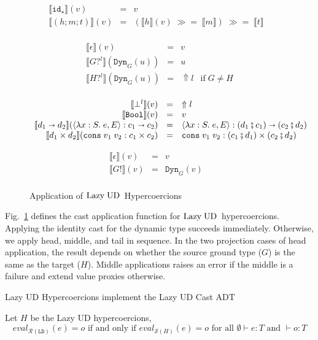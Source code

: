 \documentclass[runningheads]{llncs}
\newcommand{\sidecond}[1]{\text{if}\;#1}
\newcommand{\figequalto}[3]{#1 & = & #2 & #3 \\}
\newcommand{\LUD}{\ensuremath{\text{Lazy\;UD}}}
\newcommand{\RMachine}[1]{\ensuremath{\mathcal{R}(#1)}}
\newcommand{\LDMachine}{\RMachine{\BLD}}
\newcommand{\SMachine}[1]{\ensuremath{\mathcal{S}(#1)}}
\newcommand{\error}[1]{\ensuremath{\Uparrow#1}}
\newcommand{\Tdyn}[0]{\ensuremath{\star}}
\newcommand{\Pbool}[0]{\ensuremath{\mathtt{Bool}}}
\newcommand{\Pfunc}[2]{\ensuremath{#1 \shortrightarrow #2}}
\newcommand{\Pprod}[2]{\ensuremath{#1 \times #2}}
\newcommand{\elam}[3]{\lambda#1:#2.\;#3}
\newcommand{\econs}[2]{\mathtt{cons} \; #1 \; #2}
\newcommand{\ecast}[2]{\ensuremath{#1 : #2}}
\newcommand{\vdyn}[2]{\mathtt{Dyn}_{#1}(#2)}
\newcommand{\vfunc}[4]{\langle\elam{#1}{#2}{#3},#4\rangle}
\newcommand{\vcons}[2]{\econs{#1}{#2}}
\newcommand{\BLD}[0]{\ensuremath{\mathtt{LD}}}
\newcommand{\cnfid}[1]{\ensuremath{\mathtt{id}_{#1}}}
\newcommand{\hcci}[0]{\cnfid{\Tdyn}}
\newcommand{\hccc}[3]{\ensuremath{(#1;#2;#3)}}
\newcommand{\hche}[0]{\ensuremath{\epsilon}}
\newcommand{\hchp}[2]{\ensuremath{#1?^{#2}}}
\newcommand{\hcmbool}[0]{\Pbool}
\newcommand{\hcmfunc}[2]{\Pfunc{#1}{#2}}
\newcommand{\hcmprod}[2]{\Pprod{#1}{#2}}
\newcommand{\hcmfail}[1]{\ensuremath{\bot^l}}
\newcommand{\hcte}[0]{\ensuremath{\epsilon}}
\newcommand{\hcti}[1]{\ensuremath{#1!}}
\newcommand{\mbind}[0]{\ensuremath{\;\gg=\;}}
\newcommand{\denote}[1]{\ensuremath{\llbracket #1 \rrbracket}}
\newcommand{\compose}[2]{\ensuremath{#1 \fatsemi #2}}
\newcommand{\expressiontyping}[3]{\ensuremath{#1 \vdash #2 : #3}}
\newcommand{\valuetyping}[2]{\ensuremath{\vdash #1 : #2}}
\newcommand{\withmachineevalto}[3]{\ensuremath{\mathit{eval}_{#1}(#2)=#3}}
\newcommand{\machineequiv}[2]{
	\ensuremath{
		\withmachineevalto{#1}{e}{o}	
		\text{ if and only if }
		\withmachineevalto{#2}{e}{o}
		\text{ for all }
		\expressiontyping{\emptyset}{e}{T}
		\text{ and }
		\valuetyping{o}{T}
	}}
\begin{document}
\begin{figure}
	\fbox{$\denote{c}_c(v)=r$}
	\[
	\begin{array}{rclr}
	\figequalto{\denote{\hcci}(v)}{v}{}
	\figequalto{\denote{\hccc{h}{m}{t}}(v)}{
		(\denote{h}(v) \mbind \denote{m})
		\mbind \denote{t}
	}{}
	\end{array}
	\]
	
	\fbox{$\denote{h}_h(v)=r$}
	\[
	\begin{array}{rclr}
	\figequalto{\denote{\hche}(v)}{v}{}
	\figequalto{\denote{\hchp{G}{l}}(\vdyn{G}{u})}{u}{}
	\figequalto{\denote{\hchp{H}{l}}(\vdyn{G}{u})}{\error{l}}{
		\sidecond{G \neq H}
	}
	\end{array}
	\]
	
	\fbox{$\denote{m}_m(v)=r$}
	\[
	\begin{array}{rclr}
	\figequalto{\denote{\hcmfail{l}}(v)}{\error{l}}{}
	\figequalto{\denote{\hcmbool}(v)}{v}{}
	\figequalto{\denote{\hcmfunc{d_1}{d_2}}(\ecast{\vfunc{x}{S}{e}{E}}{\Pfunc{c_1}{c_2}})}{
		\ecast{\vfunc{x}{S}{e}{E}}{\Pfunc{(\compose{d_1}{c_1})}{(\compose{c_2}{d_2})}}
	}{}
	\figequalto{\denote{\hcmprod{d_1}{d_2}}(\ecast{\vcons{v_1}{v_2}}{\Pprod{c_1}{c_2}})}{
		\ecast{\vcons{v_1}{v_2}}{\Pprod{(\compose{c_1}{d_1})}{(\compose{c_2}{d_2})}}
	}{}
	\end{array}
	\]
	
	\fbox{$\denote{t}_t(v)=r$}
	\[
	\begin{array}{rclr}
	\figequalto{\denote{\hcte}(v)}{v}{}
	\figequalto{\denote{\hcti{G}}(v)}{\vdyn{G}{v}}{}
	\end{array}
	\]
	\caption{Application of \LUD\ Hypercoercions}
	\label{fig:LazyUD-Hypercoercions-application}
\end{figure}

Fig.~\ref{fig:LazyUD-Hypercoercions-application} defines the cast application 
function for \LUD\ hypercoercions.
Applying the identity cast for the dynamic type succeeds immediately. 
Otherwise, we apply head, middle, and tail in sequence. 
%
In the two projection cases of head application, the result depends on whether 
the source ground type ($G$) is the same as the target ($H$).
%
Middle applications raises an error if the middle is a failure and extend value 
proxies otherwise.

\begin{proposition} Lazy UD Hypercoercions implement the Lazy UD Cast ADT
\end{proposition}
\begin{theorem} Let $H$ be the Lazy UD 
	hypercoercions,
	\[\machineequiv{\LDMachine}{\SMachine{H}}\]
\end{theorem}
\end{document}
